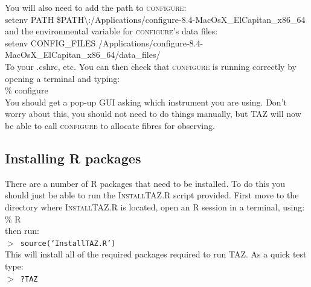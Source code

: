 \documentclass[12pt]{article}
\begin{document}
You will also need to add the path to \textsc{configure}:\\

\hspace{10mm} setenv PATH \$PATH\textbackslash:/Applications/configure-8.4-MacOsX\_ElCapitan\_x86\_64\\

and the environmental variable for \textsc{configure}'s data files:\\

\hspace{10mm}  setenv CONFIG\_FILES /Applications/configure-8.4-MacOsX\_ElCapitan\_x86\_64/data\_files/\\

To your .cshrc, etc.  You can then check that \textsc{configure} is running correctly by opening a terminal and typing: \\

\hspace{10mm} \% configure\\

You should get a pop-up GUI asking which instrument you are using. Don't worry about this, you should not need to do things manually, but \textsc{TAZ} will now be able to call \textsc{configure} to allocate fibres for observing.

\subsection{Installing R packages}

There are a number of R packages that need to be installed. To do this you should just be able to run the \textsc{InstallTAZ.R} script provided. First move to the directory where \textsc{InstallTAZ.R} is located, open an R session in a terminal, using:\\

\hspace{10mm} \% R\\

then run:\\

\hspace{10mm}  \texttt{$>$ source(`InstallTAZ.R')}\\

This will install all of the required packages required to run \textsc{TAZ}. As a quick test type:\\

\hspace{10mm}  \texttt{$>$ ?TAZ}\\
\end{document}
